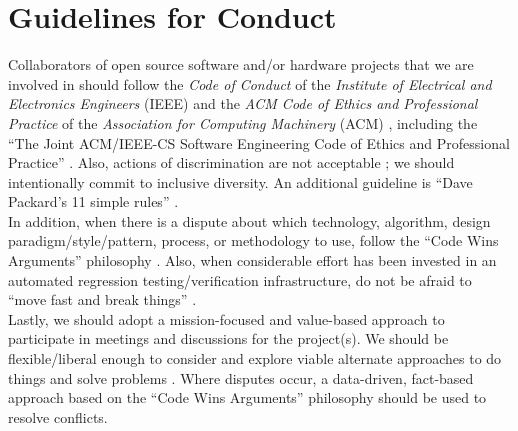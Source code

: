 \documentclass[letter,12pt]{article}
\begin{document}
\section{Guidelines for Conduct}
\label{sec:GuidelinesforConduct}

Collaborators of open source software and/or hardware projects that we are involved in should follow the {\it Code of Conduct} of the {\it Institute of Electrical and Electronics Engineers} (IEEE) \cite{IEEE2014b,IEEE2014a,IEEE2014} and the {\it ACM Code of Ethics and Professional Practice} of the {\it Association for Computing Machinery} (ACM) \cite{Gotterbarn2018b,Gotterbarn2018a,Gotterbarn2018,Brinkman2016a,ACMCouncil1992,Brinkman2017,Brinkman2016,Wolf2016,Anderson1993}, including the ``The Joint {ACM/IEEE-CS} Software Engineering Code of Ethics and Professional Practice'' \cite{Gotterbarn1999,Gotterbarn1997}. Also, actions of discrimination are not acceptable \cite{IEEE2014c}; we should intentionally commit to inclusive diversity. An additional guideline is ``Dave Packard's 11 simple rules'' \cite{HewlettPackardCompany2012}. \\


In addition, when there is a dispute about which technology, algorithm, design paradigm/style/pattern, process, or methodology to use, follow the ``Code Wins Arguments'' philosophy \cite{Kushner2011,Zuckerberg2012}. Also, when considerable effort has been invested in an automated regression testing/verification infrastructure, do not be afraid to ``move fast and break things'' \cite{Fong2011,Evangelista2012}. \\

Lastly, we should adopt a mission-focused and value-based approach to participate in meetings and discussions for the project(s). We should be flexible/liberal enough to consider and explore viable alternate approaches to do things and solve problems \cite{Beedle2001,Beedle2001a}. Where disputes occur, a data-driven, fact-based approach based on the ``Code Wins Arguments'' philosophy should be used to resolve conflicts.
\end{document}
